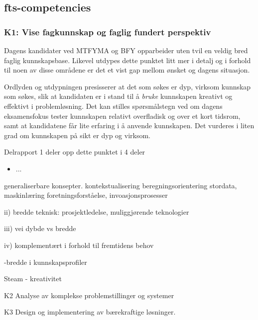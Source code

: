 \subsection{fts-competencies}

\subsubsection{K1: Vise fagkunnskap og faglig fundert perspektiv}

Dagens kandidater ved MTFYMA og BFY opparbeider uten tvil en veldig bred faglig kunnskapsbase. Likevel utdypes dette punktet litt mer i detalj og i forhold til noen av disse områdene er det et vist gap mellom ønsket og dagens situasjon. 

Ordlyden og utdypningen presisserer at det som søkes er dyp, virksom kunnskap som søkes, slik at kandidaten er i stand til å \emph{bruke} kunnskapen kreativt og effektivt i problemløsning. Det kan stilles spørsmålstegn ved om dagens eksamensfokus tester kunnskapen relativt overfladisk og over et kort tidsrom, samt at kandidatene får lite erfaring i å anvende kunnskapen. Det vurderes i liten grad om kunnskapen på sikt er dyp og virksom.

Delrapport 1 deler opp dette punktet i 4 deler

\begin{itemize}
	\item ...
\end{itemize}

generaliserbare konsepter.
kontekstualisering
beregningsorientering
stordata, maskinlæring
foretningsforståelse, invoasjonsprosesser

ii) bredde teknisk: prosjektledelse, muliggjørende teknologier

iii) vei dybde vs bredde

iv) komplementært i forhold til fremtidens behov

-bredde i kunnskapsprofiler

Steam - kreativitet

K2 Analyse av komplekse problemstillinger og systemer

K3 Design og implementering av bærekraftige løsninger.
